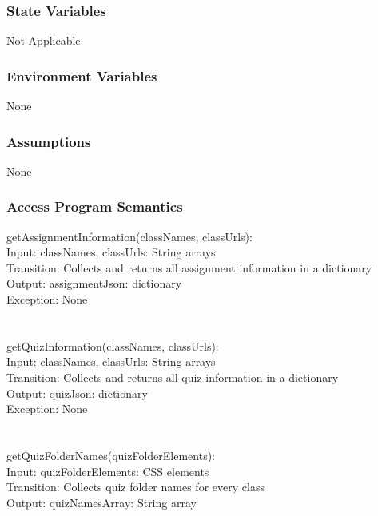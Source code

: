 \documentclass[12pt, titlepage]{article}
\begin{document}
\subsubsection{State Variables}
Not Applicable
\subsubsection{Environment Variables}
None
\subsubsection{Assumptions}
None
\subsubsection{Access Program Semantics}
getAssignmentInformation(classNames, classUrls):\\

    Input: classNames, classUrls: String arrays\\

    Transition: Collects and returns all assignment information in a dictionary\\

    Output: assignmentJson: dictionary\\

    Exception: None\\
\\
\\
getQuizInformation(classNames, classUrls):\\

    Input: classNames, classUrls: String arrays\\

    Transition: Collects and returns all quiz information in a dictionary\\

    Output: quizJson: dictionary\\

    Exception: None\\
\\
\\
getQuizFolderNames(quizFolderElements):\\
    
    Input: quizFolderElements: CSS elements\\
    
    Transition: Collects quiz folder names for every class\\
    
    Output: quizNamesArray: String array\\
    
\end{document}
